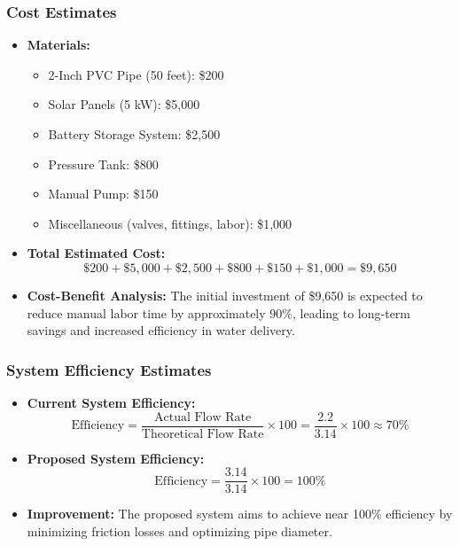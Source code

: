 \documentclass[12pt]{article}
\begin{document}
    \subsubsection{Cost Estimates}
    \begin{itemize}
        \item \textbf{Materials:}
        \begin{itemize}
            \item 2-Inch PVC Pipe (50 feet): \$200
            \item Solar Panels (5 kW): \$5,000
            \item Battery Storage System: \$2,500
            \item Pressure Tank: \$800
            \item Manual Pump: \$150
            \item Miscellaneous (valves, fittings, labor): \$1,000
        \end{itemize}
        
        \item \textbf{Total Estimated Cost:}
        \[
        \$200 + \$5,000 + \$2,500 + \$800 + \$150 + \$1,000 = \$9,650
        \]
        
        \item \textbf{Cost-Benefit Analysis:}
        The initial investment of \$9,650 is expected to reduce manual labor time by approximately 90\%, leading to long-term savings and increased efficiency in water delivery.
    \end{itemize}
    
    \subsubsection{System Efficiency Estimates}
    \begin{itemize}
        \item \textbf{Current System Efficiency:} 
        \[
        \text{Efficiency} = \frac{\text{Actual Flow Rate}}{\text{Theoretical Flow Rate}} \times 100 = \frac{2.2}{3.14} \times 100 \approx 70\%
        \]
        
        \item \textbf{Proposed System Efficiency:}
        \[
        \text{Efficiency} = \frac{3.14}{3.14} \times 100 = 100\%
        \]
        
        \item \textbf{Improvement:} The proposed system aims to achieve near 100\% efficiency by minimizing friction losses and optimizing pipe diameter.
    \end{itemize}
    
\end{document}
